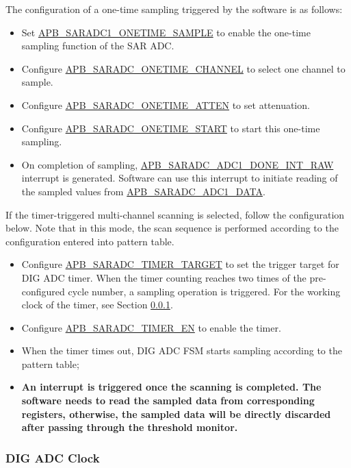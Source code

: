 \documentclass[main\_\_EN.tex]{subfiles}
\begin{document}
The configuration of a one-time sampling triggered by the software is as follows:
\begin{itemize}
    \item Set \hyperref[fielddesc:APBSARADCSARADC1ONETIMESAMPLE]{APB\_SARADC1\_ONETIME\_SAMPLE} to enable the one-time sampling function of the SAR ADC.
    \item Configure \hyperref[fielddesc:APBSARADCSARADCONETIMECHANNEL]{APB\_SARADC\_ONETIME\_CHANNEL} to select one channel to sample.
    \item Configure \hyperref[fielddesc:APBSARADCSARADCONETIMEATTEN]{APB\_SARADC\_ONETIME\_ATTEN} to set attenuation.
    \item Configure \hyperref[fielddesc:APBSARADCSARADCONETIMESTART]{APB\_SARADC\_ONETIME\_START} to start this one-time sampling.
    \item On completion of sampling, \hyperref[fielddesc:APBSARADCAPBSARADC1DONEINTRAW]{APB\_SARADC\_ADC1\_DONE\_INT\_RAW} interrupt is generated. Software can use this interrupt to initiate reading of the sampled values from \hyperref[fielddesc:APBSARADCAPBSARADC1DATA]{APB\_SARADC\_ADC1\_DATA}.
\end{itemize}
If the timer-triggered multi-channel scanning is selected, follow the configuration below. Note that in this mode, the scan sequence is performed according to the configuration entered into pattern table.
\begin{itemize}
        \item Configure  \hyperref[fielddesc:APBSARADCSARADCTIMERTARGET]{APB\_SARADC\_TIMER\_TARGET} to set the trigger target for DIG ADC timer. When the timer counting reaches two times of the pre-configured cycle number, a sampling operation is triggered. For the working clock of the timer, see Section \ref{other:sensor-para-dig-adc-clock}.
        \item Configure  \hyperref[fielddesc:APBSARADCSARADCTIMEREN]{APB\_SARADC\_TIMER\_EN} to enable the timer.
        \item When the timer times out, DIG ADC FSM starts sampling according to the pattern table;
        \item \textbf{An interrupt is triggered once the scanning is completed. The software needs to read the sampled data from corresponding registers, otherwise, the sampled data will be directly discarded after passing through the threshold monitor.}

\end{itemize}

\subsubsection{DIG ADC Clock}\label{other:sensor-para-dig-adc-clock}
\end{document}
